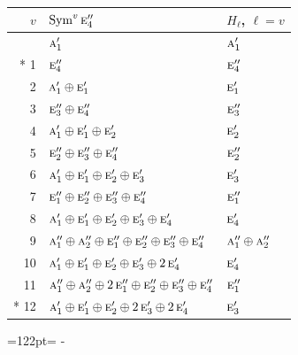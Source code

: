 \documentclass[10pt,a4paper]{article}
\newcommand{\needspace}[1]{\par\penalty-100\begingroup\dimen0=#1\relax\dimen2=\pagegoal
  \advance\dimen2-\pagetotal\ifdim\dimen0>\dimen2\relax\ifdim\dimen2>0pt\vfil\break\fi\fi
  \endgroup}
\numberwithin{equation}{section}
\newcommand{\irr}[1]{\text{\normalfont\scshape #1}}
\begin{document}
{\small\begin{longtable}{@{}rll@{}}\toprule
$v$ & $\operatorname{Sym}^{v}\irr{e}_{4}''$ & $H_\ell$, $\ell = v$\\\midrule\endhead
\bottomrule\endfoot\endlastfoot
0 & $\irr{a}_{1}'$ & $\irr{a}_{1}'$\\*
1 & $\irr{e}_{4}''$ & $\irr{e}_{4}''$\\
2 & $\irr{a}_{1}' \oplus \irr{e}_{1}'$ & $\irr{e}_{1}'$\\
3 & $\irr{e}_{3}'' \oplus \irr{e}_{4}''$ & $\irr{e}_{3}''$\\
4 & $\irr{a}_{1}' \oplus \irr{e}_{1}' \oplus \irr{e}_{2}'$ & $\irr{e}_{2}'$\\
5 & $\irr{e}_{2}'' \oplus \irr{e}_{3}'' \oplus \irr{e}_{4}''$ & $\irr{e}_{2}''$\\
6 & $\irr{a}_{1}' \oplus \irr{e}_{1}' \oplus \irr{e}_{2}' \oplus \irr{e}_{3}'$ & $\irr{e}_{3}'$\\
7 & $\irr{e}_{1}'' \oplus \irr{e}_{2}'' \oplus \irr{e}_{3}'' \oplus \irr{e}_{4}''$ & $\irr{e}_{1}''$\\
8 & $\irr{a}_{1}' \oplus \irr{e}_{1}' \oplus \irr{e}_{2}' \oplus \irr{e}_{3}' \oplus \irr{e}_{4}'$ & $\irr{e}_{4}'$\\
9 & $\irr{a}_{1}'' \oplus \irr{a}_{2}'' \oplus \irr{e}_{1}'' \oplus \irr{e}_{2}'' \oplus \irr{e}_{3}'' \oplus \irr{e}_{4}''$ & $\irr{a}_{1}'' \oplus \irr{a}_{2}''$\\
10 & $\irr{a}_{1}' \oplus \irr{e}_{1}' \oplus \irr{e}_{2}' \oplus \irr{e}_{3}' \oplus 2\,\irr{e}_{4}'$ & $\irr{e}_{4}'$\\
11 & $\irr{a}_{1}'' \oplus \irr{a}_{2}'' \oplus 2\,\irr{e}_{1}'' \oplus \irr{e}_{2}'' \oplus \irr{e}_{3}'' \oplus \irr{e}_{4}''$ & $\irr{e}_{1}''$\\*
12 & $\irr{a}_{1}' \oplus \irr{e}_{1}' \oplus \irr{e}_{2}' \oplus 2\,\irr{e}_{3}' \oplus 2\,\irr{e}_{4}'$ & $\irr{e}_{3}'$\\
\bottomrule\end{longtable}}
\needspace{122pt}
\end{document}
